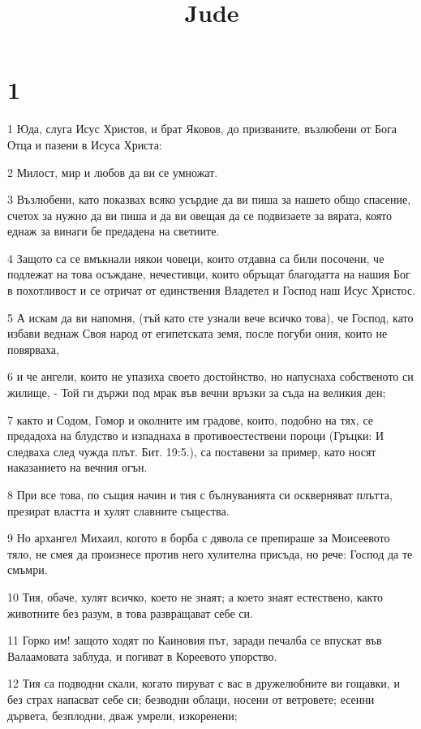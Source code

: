 

\title{Jude}


\chapter{1}

\par 1 Юда, слуга Исус Христов, и брат Яковов, до призваните, възлюбени от Бога Отца и пазени в Исуса Христа:
\par 2 Милост, мир и любов да ви се умножат.
\par 3 Възлюбени, като показвах всяко усърдие да ви пиша за нашето общо спасение, счетох за нужно да ви пиша и да ви овещая да се подвизаете за вярата, която еднаж за винаги бе предадена на светиите.
\par 4 Защото са се вмъкнали някои човеци, които отдавна са били посочени, че подлежат на това осъждане, нечестивци, които обръщат благодатта на нашия Бог в похотливост и се отричат от единствения Владетел и Господ наш Исус Христос.
\par 5 А искам да ви напомня, (тъй като сте узнали вече всичко това), че Господ, като избави веднаж Своя народ от египетската земя, после погуби ония, които не повярваха,
\par 6 и че ангели, които не упазиха своето достойнство, но напуснаха собственото си жилище, - Той ги държи под мрак във вечни връзки за съда на великия ден;
\par 7 както и Содом, Гомор и околните им градове, които, подобно на тях, се предадоха на блудство и изпаднаха в противоестествени пороци (Гръцки: И следваха след чужда плът. Бит. 19:5.), са поставени за пример, като носят наказанието на вечния огън.
\par 8 При все това, по същия начин и тия с бълнуванията си оскверняват плътта, презират властта и хулят славните същества.
\par 9 Но архангел Михаил, когото в борба с дявола се препираше за Моисеевото тяло, не смея да произнесе против него хулителна присъда, но рече: Господ да те смъмри.
\par 10 Тия, обаче, хулят всичко, което не знаят; а което знаят естествено, както животните без разум, в това развращават себе си.
\par 11 Горко им! защото ходят по Каиновия път, заради печалба се впускат във Валаамовата заблуда, и погиват в Кореевото упорство.
\par 12 Тия са подводни скали, когато пируват с вас в дружелюбните ви гощавки, и без страх напасват себе си; безводни облаци, носени от ветровете; есенни дървета, безплодни, дваж умрели, изкоренени;

